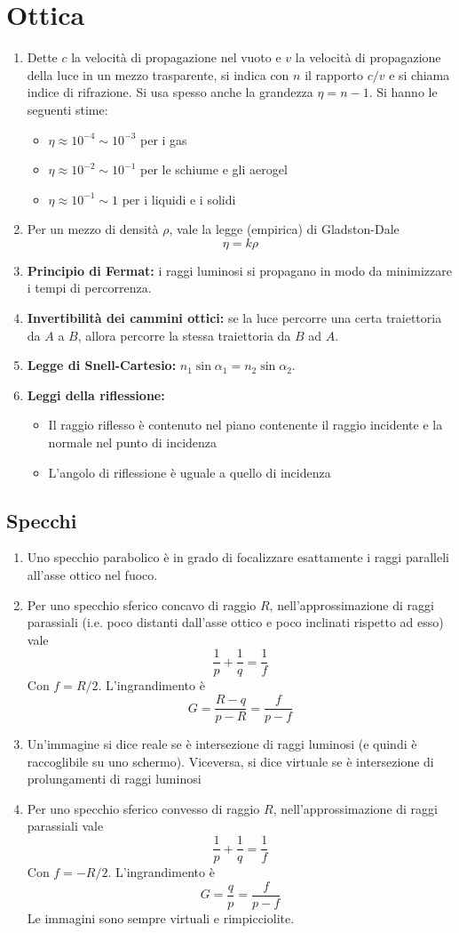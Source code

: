 \documentclass[a4paper,11pt]{article}
\begin{document}
\section{Ottica}
\begin{enumerate}[resume]
	\item Dette $c$ la velocità di propagazione nel vuoto e $v$ la velocità di propagazione della luce in un mezzo trasparente, si indica con $n$ il rapporto $c/v$ e si chiama indice di rifrazione. Si usa spesso anche la grandezza $\eta=n-1$. Si hanno le seguenti stime:
	\begin{itemize}
		\item $\eta\approx10^{-4}\sim10^{-3}$ per i gas
		\item $\eta\approx10^{-2}\sim10^{-1}$ per le schiume e gli aerogel
		\item $\eta\approx10^{-1}\sim1$ per i liquidi e i solidi
	\end{itemize}
	\item Per un mezzo di densità $\rho$, vale la legge (empirica) di Gladston-Dale
	\[\eta=k\rho\]
	\item \textbf{Principio di Fermat:} i raggi luminosi si propagano in modo da minimizzare i tempi di percorrenza.
	\item \textbf{Invertibilità dei cammini ottici:} se la luce percorre una certa traiettoria da $A$ a $B$, allora percorre la stessa traiettoria da $B$ ad $A$.
	\item\textbf{Legge di Snell-Cartesio:} $n_1\sin\alpha_1=n_2\sin\alpha_2$.
	\item\textbf{Leggi della riflessione:}
	\begin{itemize}
		\item Il raggio riflesso è contenuto nel piano contenente il raggio incidente e la normale nel punto di incidenza
		\item L'angolo di riflessione è uguale a quello di incidenza
	\end{itemize}
\end{enumerate}
\subsection{Specchi}
\begin{enumerate}[resume]
	\item Uno specchio parabolico è in grado di focalizzare esattamente i raggi paralleli all'asse ottico nel fuoco.
	\item Per uno specchio sferico concavo di raggio $R$, nell'approssimazione di raggi parassiali (i.e. poco distanti dall'asse ottico e poco inclinati rispetto ad esso) vale 
	\[\frac{1}{p}+\frac{1}{q}=\frac{1}{f}\]
	Con $f=R/2$. L'ingrandimento è
	\[G=\frac{R-q}{p-R}=\frac{f}{p-f}\]
	\item Un'immagine si dice reale se è intersezione di raggi luminosi (e quindi è raccoglibile su uno schermo). Viceversa, si dice virtuale se è intersezione di prolungamenti di raggi luminosi
	\item Per uno specchio sferico convesso di raggio $R$, nell'approssimazione di raggi parassiali vale 
	\[\frac{1}{p}+\frac{1}{q}=\frac{1}{f}\]
	Con $f=-R/2$. L'ingrandimento è
	\[G=\frac{q}{p}=\frac{f}{p-f}\]
	Le immagini sono sempre virtuali e rimpicciolite.
\end{enumerate}
\end{document}
